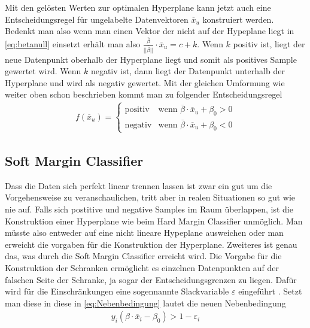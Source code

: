 \documentclass[
]{article}
\begin{document}
Mit den gelösten Werten zur optimalen Hyperplane kann jetzt auch eine
Entscheidungsregel für ungelabelte Datenvektoren \(\overline{x}_u\)
konstruiert werden. Bedenkt man also wenn man einen Vektor der nicht auf
der Hypeplane liegt in \eqref{eq:betanull} einsetzt erhält man also
\(\frac{\overline \beta}{||\overline{\beta}||}\cdot \overline{x}_u=c+k\).
Wenn \(k\) positiv ist, liegt der neue Datenpunkt oberhalb der
Hyperplane liegt und somit als positives Sample gewertet wird. Wenn
\(k\) negativ ist, dann liegt der Datenpunkt unterhalb der Hyperplane
und wird als negativ gewertet. Mit der gleichen Umformung wie weiter
oben schon beschrieben kommt man zu folgender Entscheidungsregel
\begin{align}
f(\overline{x}_u)=\begin{cases}\mathrm{positiv}&\text{wenn } \overline{\beta}\cdot \overline{x}_u+\beta_0 > 0\\
\mathrm{negativ} & \text{wenn }\overline{\beta}\cdot \overline{x}_u+\beta_0<0
\end{cases}\label{eq:decisionf}
\end{align}

\subsection{Soft Margin Classifier}

Dass die Daten sich perfekt linear trennen lassen ist zwar ein gut um
die Vorgehensweise zu veranschaulichen, tritt aber in realen Situationen
so gut wie nie auf. Falls sich postitive und negative Samples im Raum
überlappen, ist die Konstruktion einer Hyperplane wie beim Hard Margin
Classifier unmöglich. Man müsste also entweder auf eine nicht lineare
Hypeplane ausweichen oder man erweicht die vorgaben für die Konstruktion
der Hyperplane. Zweiteres ist genau das, was durch die Soft Margin
Classifier erreicht wird. Die Vorgabe für die Konstruktion der Schranken
ermöglicht es einzelnen Datenpunkten auf der falschen Seite der
Schranke, ja sogar der Entscheidungsgrenzen zu liegen. Dafür wird für
die Einschränkungen eine sogennannte Slackvariable \(\varepsilon\)
eingeführt \parencite{jamesIntroductionStatisticalLearning2021}. Setzt
man diese in diese in \eqref{eq:Nebenbedingung} lautet die neuen
Nebenbedingung \begin{align}
y_i(\beta \cdot \overline{x}_i-\beta_0)>1- \varepsilon_i \label{eq:nebbedsfm}
\end{align}
\end{document}
